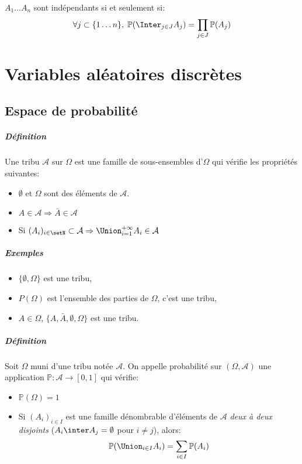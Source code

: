 \documentclass[a4paper,10pt,french,openany]{memoir}
\newcommand{\Proba}{\mathbb{P}}
\newcommand{\tribu}[1]{\mathcal{#1}}
\newcommand{\implique}{\Rightarrow}
\begin{document}
$A_1 \dots A_n$ sont indépendants si et seulement si:
\[\forall j \subset \lbrace 1 \dots n \rbrace, \; \Proba(\Inter_{j \in J} A_j) = \prod_{j \in J} \Proba(A_j)\]

\chapter{Variables aléatoires discrètes}

\section{Espace de probabilité}

\paragraph{Définition}
Une tribu $\tribu{A}$ sur $\Omega$ est une famille de sous-ensembles d'$\Omega$ qui vérifie les propriétés suivantes:

\begin{itemize}
 \item $\emptyset$ et $\Omega$ sont des éléments de $\tribu A$.
 \item $A \in \tribu A \implique \bar A \in \tribu A $
 \item Si $(A_i)_{i \in \setN} \subset \tribu A \implique \Union_{i=1}^{+\infty} A_i \in \tribu A$
\end{itemize}

\paragraph{Exemples}
\begin{itemize}
 \item $\{\emptyset, \Omega\}$ est une tribu,
 \item $P(\Omega)$ est l'ensemble des parties de $\Omega$, c'est une tribu,
 \item $A \in \Omega$, $\{ A, \bar A, \emptyset, \Omega \}$ est une tribu.
\end{itemize}

\paragraph{Définition}
Soit $\Omega$ muni d'une tribu notée $\tribu A$.
On appelle probabilité sur $(\Omega, \tribu A)$ une application 
\( \Proba: \tribu A \rightarrow [0, 1] \)
qui vérifie:
\begin{itemize}
 \item $\Proba(\Omega) = 1$
 \item Si $(A_i)_{i \in I}$ est une famille dénombrable d'éléments de $\tribu A$ \emph{deux à deux disjoints} ($A_i \inter A_j = \emptyset$ pour $i \neq j$), alors:
 \[ \Proba(\Union_{i\in I} A_i) = \sum_{i\in I} \Proba(A_i) \]
\end{itemize}
\end{document}
